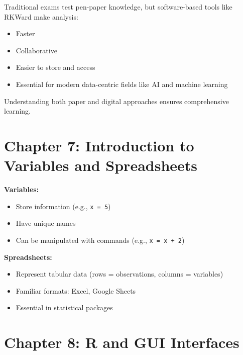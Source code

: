\documentclass[
  letterpaper,
  DIV=11,
  numbers=noendperiod]{scrreprt}
\providecommand{\tightlist}{%
  \setlength{\itemsep}{0pt}\setlength{\parskip}{0pt}}
\begin{document}
Traditional exams test pen-paper knowledge, but software-based tools
like RKWard make analysis:

\begin{itemize}
\tightlist
\item
  Faster\\
\item
  Collaborative\\
\item
  Easier to store and access\\
\item
  Essential for modern data-centric fields like AI and machine learning
\end{itemize}

Understanding both paper and digital approaches ensures comprehensive
learning.


\chapter{Chapter 7: Introduction to Variables and
Spreadsheets}\label{chapter-7-introduction-to-variables-and-spreadsheets}

\textbf{Variables:}

\begin{itemize}
\tightlist
\item
  Store information (e.g., \texttt{x\ =\ 5})\\
\item
  Have unique names\\
\item
  Can be manipulated with commands (e.g., \texttt{x\ =\ x\ +\ 2})
\end{itemize}

\textbf{Spreadsheets:}

\begin{itemize}
\tightlist
\item
  Represent tabular data (rows = observations, columns = variables)\\
\item
  Familiar formats: Excel, Google Sheets\\
\item
  Essential in statistical packages
\end{itemize}


\chapter{Chapter 8: R and GUI
Interfaces}\label{chapter-8-r-and-gui-interfaces}
\end{document}
